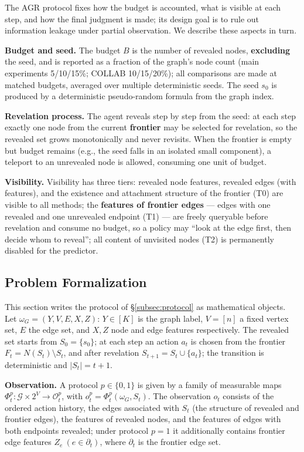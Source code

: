\documentclass{article}
\begin{document}
The AGR protocol fixes how the budget is accounted, what is visible at each step, and how the final judgment is made; its design goal is to rule out information leakage under partial observation. We describe these aspects in turn.

\textbf{Budget and seed.} The budget $B$ is the number of revealed nodes, \textbf{excluding} the seed, and is reported as a fraction of the graph's node count (main experiments 5/10/15\%; COLLAB 10/15/20\%); all comparisons are made at matched budgets, averaged over multiple deterministic seeds. The seed $s_0$ is produced by a deterministic pseudo-random formula from the graph index.

\textbf{Revelation process.} The agent reveals step by step from the seed: at each step exactly one node from the current \textbf{frontier} may be selected for revelation, so the revealed set grows monotonically and never revisits. When the frontier is empty but budget remains (e.g., the seed falls in an isolated small component), a teleport to an unrevealed node is allowed, consuming one unit of budget.

\textbf{Visibility.} Visibility has three tiers: revealed node features, revealed edges (with features), and the existence and attachment structure of the frontier (T0) are visible to all methods; the \textbf{features of frontier edges} --- edges with one revealed and one unrevealed endpoint (T1) --- are freely queryable before revelation and consume no budget, so a policy may ``look at the edge first, then decide whom to reveal''; all content of unvisited nodes (T2) is permanently disabled for the predictor.

\subsection{Problem Formalization}
\label{subsec:formal}

This section writes the protocol of \S\ref{subsec:protocol} as mathematical objects. Let $\omega_G=(Y,V,E,X,Z)$: $Y\in[K]$ is the graph label, $V=[n]$ a fixed vertex set, $E$ the edge set, and $X,Z$ node and edge features respectively. The revealed set starts from $S_0=\{s_0\}$; at each step an action $a_t$ is chosen from the frontier $F_t=N(S_t)\setminus S_t$, and after revelation $S_{t+1}=S_t\cup\{a_t\}$; the transition is deterministic and $|S_t|=t+1$.

\textbf{Observation.} A protocol $p\in\{0,1\}$ is given by a family of measurable maps $\Phi^p_t:\mathcal G\times 2^V\to\mathcal O^p_t$, with $o^p_t=\Phi^p_t(\omega_G,S_t)$. The observation $o_t$ consists of the ordered action history, the edges associated with $S_t$ (the structure of revealed and frontier edges), the features of revealed nodes, and the features of edges with both endpoints revealed; under protocol $p{=}1$ it additionally contains frontier edge features $Z_e\ (e\in\partial_t)$, where $\partial_t$ is the frontier edge set.
\end{document}
